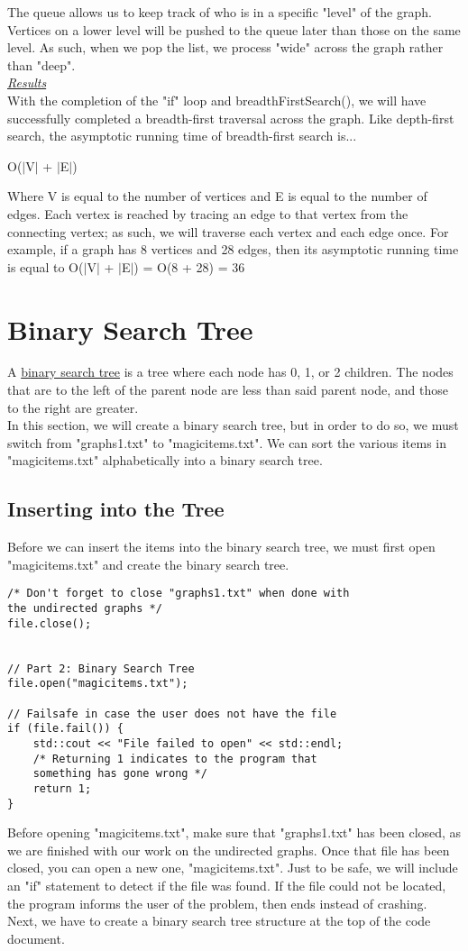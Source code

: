\documentclass{article}
\begin{document}
The queue allows us to keep track of who is in a specific "level" of the graph. Vertices on a lower level will be pushed to the queue later than those on the same level. As such, when we pop the list, we process "wide" across the graph rather than "deep". \\

\underline{\textit{Results}} \\
With the completion of the "if" loop and breadthFirstSearch(), we will have successfully completed a breadth-first traversal across the graph. Like depth-first search, the asymptotic running time of breadth-first search is...
\begin{center}
    O($|$V$|$ + $|$E$|$)
\end{center}
Where V is equal to the number of vertices and E is equal to the number of edges. Each vertex is reached by tracing an edge to that vertex from the connecting vertex; as such, we will traverse each vertex and each edge once. For example, if a graph has 8 vertices and 28 edges, then its asymptotic running time is equal to O($|$V$|$ + $|$E$|$) = O(8 + 28) = 36


\pagebreak
\section{Binary Search Tree}
A \underline{binary search tree} is a tree where each node has 0, 1, or 2 children. The nodes that are to the left of the parent node are less than said parent node, and those to the right are greater. \\
In this section, we will create a binary search tree, but in order to do so, we must switch from "graphs1.txt" to "magicitems.txt". We can sort the various items in "magicitems.txt" alphabetically into a binary search tree. 
\subsection{Inserting into the Tree}
Before we can insert the items into the binary search tree, we must first open "magicitems.txt" and create the binary search tree.

\begin{lstlisting}
/* Don't forget to close "graphs1.txt" when done with 
the undirected graphs */
file.close();


// Part 2: Binary Search Tree
file.open("magicitems.txt");

// Failsafe in case the user does not have the file
if (file.fail()) {
    std::cout << "File failed to open" << std::endl;
    /* Returning 1 indicates to the program that 
    something has gone wrong */
    return 1;
}
\end{lstlisting}
Before opening "magicitems.txt", make sure that "graphs1.txt" has been closed, as we are finished with our work on the undirected graphs. Once that file has been closed, you can open a new one, "magicitems.txt". Just to be safe, we will include an "if" statement to detect if the file was found. If the file could not be located, the program informs the user of the problem, then ends instead of crashing. \\
Next, we have to create a binary search tree structure at the top of the code document.
\end{document}

